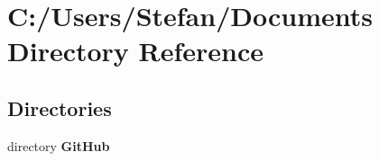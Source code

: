 \section{C\-:/\-Users/\-Stefan/\-Documents Directory Reference}
\label{dir_34b8779e384de29838acab2b8c72ef92}
\subsection*{Directories}
\begin{DoxyCompactItemize}
\item 
directory {\bf Git\-Hub}
\end{DoxyCompactItemize}
